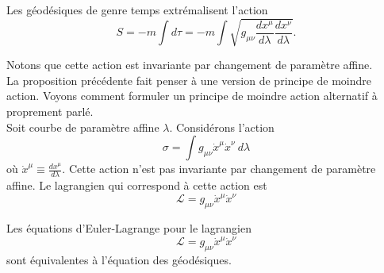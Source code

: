\documentclass[a4paper,11pt]{report}
\begin{document}
            \begin{prop}\begin{leftbar}
                Les géodésiques de genre temps extrémalisent l'action
                \begin{equation}
                    S = -m\int d\tau = -m\int \sqrt{g_{\mu\nu}\frac{dx^\mu}{d\lambda}\frac{dx^\nu}{d\lambda}}.
                \end{equation}
            \end{leftbar}\end{prop}
            
            Notons que cette action est invariante par changement de paramètre affine.\\
            
            La proposition précédente fait penser à une version de principe de moindre action. Voyons comment formuler un principe de moindre action alternatif à proprement parlé.\\
            
            Soit courbe de paramètre affine $\lambda$. Considérons l'action
            \begin{equation}
                \sigma = \int g_{\mu\nu}\dot{x}^\mu\dot{x}^\nu~d\lambda
            \end{equation}
            où $\dot{x}^\mu\equiv\frac{dx^\mu}{d\lambda}$. Cette action n'est pas invariante par changement de paramètre affine. Le lagrangien qui correspond à cette action est 
            \begin{equation}
                \mathscr{L} = g_{\mu\nu}\dot{x}^\mu\dot{x}^\nu
            \end{equation}
            
            \begin{prop}\begin{leftbar}
                Les équations d'Euler-Lagrange pour le lagrangien
                \begin{equation}
                \mathscr{L} = g_{\mu\nu}\dot{x}^\mu\dot{x}^\nu
                \end{equation}
                sont équivalentes à l'équation des géodésiques.
            \end{leftbar}\end{prop}
            
\end{document}
